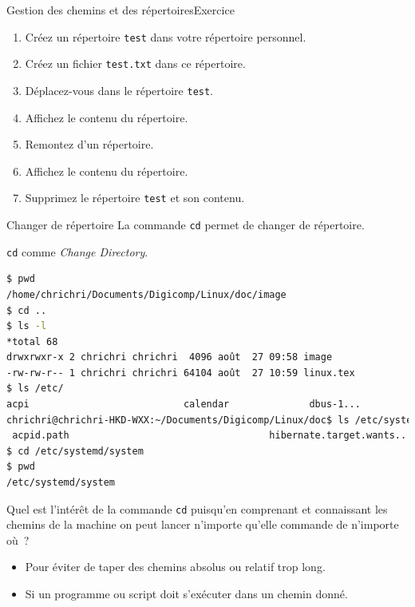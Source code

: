 \documentclass{beamer}
\begin{document}
    \begin{frame}{Gestion des chemins et des répertoires}{Exercice \execcounterdispinc}
        \begin{enumerate}
            \item Créez un répertoire \lstinline{test} dans votre répertoire personnel.
            \item Créez un fichier \lstinline{test.txt} dans ce répertoire.
            \item Déplacez-vous dans le répertoire \lstinline{test}.
            \item Affichez le contenu du répertoire.
            \item Remontez d'un répertoire.
            \item Affichez le contenu du répertoire.
            \item Supprimez le répertoire \lstinline{test} et son contenu.
        \end{enumerate}
    \end{frame}


    \begin{frame}[fragile]{Changer de répertoire}
        La commande \lstinline{cd} permet de changer de répertoire.

        \lstinline{cd} comme \textit{Change Directory}.
        \begin{lstlisting}[language=bash,basicstyle=\tiny\ttfamily]
$ pwd
/home/chrichri/Documents/Digicomp/Linux/doc/image
$ cd ..
$ ls -l
*total 68
drwxrwxr-x 2 chrichri chrichri  4096 août  27 09:58 image
-rw-rw-r-- 1 chrichri chrichri 64104 août  27 10:59 linux.tex
$ ls /etc/
acpi                           calendar              dbus-1...
chrichri@chrichri-HKD-WXX:~/Documents/Digicomp/Linux/doc$ ls /etc/systemd/system
 acpid.path                                   hibernate.target.wants...
$ cd /etc/systemd/system
$ pwd
/etc/systemd/system
        \end{lstlisting}
        Quel est l'intérêt de la commande \lstinline{cd} puisqu'en comprenant et connaissant les chemins de la machine on peut lancer n'importe qu'elle commande de n'importe où~?
        \pause
        \begin{itemize}
            \item Pour éviter de taper des chemins absolus ou relatif trop long.
            \item Si un programme ou script doit s'exécuter dans un chemin donné.
        \end{itemize}
    \end{frame}
\end{document}
